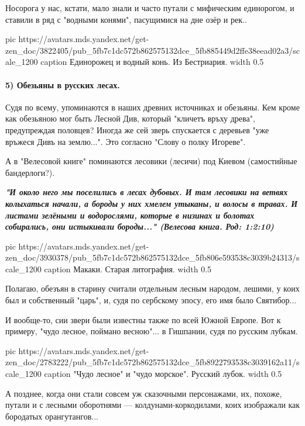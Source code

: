 Носорога у нас, кстати, мало знали и часто путали с мифическим единорогом, и
ставили в ряд с "водными конями", пасущимися на дне озёр и рек..

\ifcmt
  pic https://avatars.mds.yandex.net/get-zen_doc/3822405/pub_5fb7c1dc572b862575132dce_5fb885449d2ffe38eead02a3/scale_1200
	caption Единорожец и водный конь. Из Бестриария.
	width 0.5
\fi

\paragraph{5) Обезьяны в русских лесах.}

Судя по всему, упоминаются в наших древних источниках и обезьяны. Кем кроме как
обезьяною мог быть Лесной Див, который "кличетъ връху древа", предупреждая
половцев? Иногда же сей зверь спускается с деревьев "уже връжеся Дивъ на
землю...". Это согласно "Слову о полку Игореве".

А в "Велесовой книге" поминаются лесовики (лесичи) под Киевом (самостийные
бандерлоги?). 

\begin{leftbar}
  \begingroup
    \em\large\bfseries\color{blue}
		"И около него мы поселились в лесах дубовых. И там лесовики на ветвях
				колыхаться начали, а бороды у них хмелем утыканы, и волосы в травах. И
				листами зелёными и водорослями, которые в низинах и болотах собирались,
				они истыкивали бороды..." (Велесова книга. Род: 1:2:10)
  \endgroup
\end{leftbar}

\ifcmt
  pic https://avatars.mds.yandex.net/get-zen_doc/3930378/pub_5fb7c1dc572b862575132dce_5fb806e593538c3039b24313/scale_1200
	caption Макаки. Старая литография.
	width 0.5
\fi

Полагаю, обезъян в старину считали отдельным лесным народом, лешими, у коих был
и собственный "царь", и, судя по сербскому эпосу, его имя было Святибор...

И вообще-то, сии звери были известны также по всей Южной Европе. Вот к примеру,
"чудо лесное, поймано весною"... в Гишпании, судя по русским лубкам.


\ifcmt
  pic https://avatars.mds.yandex.net/get-zen_doc/2783222/pub_5fb7c1dc572b862575132dce_5fb8922793538c3039162a11/scale_1200
	caption "Чудо лесное" и "чудо морское". Русский лубок.
	width 0.5
\fi

А позднее, когда они стали совсем уж сказочными персонажами, их, похоже, путали
и с лесными оборотнями — колдунами-коркодилами, коих изображали как бородатых
орангутангов...


